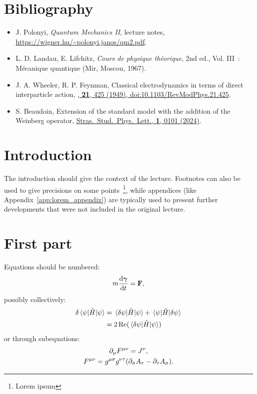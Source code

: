 \documentclass[
 reprint,
 unsortedaddress,
 preprintnumbers,
 nobibnotes,
 nofootinbib,
 longbibliography,
 amsmath,amssymb,
 aps,pra,
 onecolumn
]{revtex4-2}
\def\sspl{Stras.\ Stud.\ Phys.\ Lett.}%
\begin{document}

\section*{Bibliography}

\begin{itemize}
    \item J. Polonyi, \textit{Quantum Mechanics II}, lecture notes, \url{https://wigner.hu/~polonyi.janos/qm2.pdf}.
    \item L. D. Landau, E. Lifchitz, \textit{Cours de physique théorique}, 2nd ed., Vol. III~: Mécanique quantique (Mir, Moscou, 1967).
    \item J. A. Wheeler, R. P. Feynman, Classical electrodynamics in terms of direct interparticle action, \href{https://doi.org/10.1103/RevModPhys.21.425}{\rmp, {\bf 21}, 425 (1949), doi:10.1103/RevModPhys.21.425}.
    \item S. Beaudoin, Extension of the standard model with the addition of the Weinberg operator, \href{https://www.2spl.fr/web/content/607?unique=b4cea604932e47fba8e553dd3b51e55ddadd3f09}{\sspl, {\bf 1}, 0101 (2024)}.
\end{itemize}


\section*{Introduction}

The introduction should give the context of the lecture. Footnotes can also be used to give precisions on some points~\footnote{Lorem ipsum}, while appendices (like Appendix~\ref{app:lorem_appendix}) are typically used to present further developments that were not included in the original lecture.

\section{First part}

Equations should be numbered:
\begin{equation}
    m \dv{\bm\gamma}{t} = \mathbf{F} ,
\end{equation}
possibly collectively:
\begin{equation}
\begin{split}
    \delta \expval{\hat{H}}{\psi} &= \mel{\delta \psi}{\hat{H}}{\psi} + \mel{\psi}{\hat{H}}{\delta \psi} \\
    &= 2 \Re(\mel{\delta \psi}{\hat{H}}{\psi})
\end{split}
\end{equation}
or through subequations:
\begin{subequations}
\begin{gather}
    \partial_\mu F^{\mu\nu} = J^\nu, \\
    F^{\mu\nu} = g^{\mu\sigma} g^{\nu\tau} \pqty{ \partial_\sigma A_\tau - \partial_\tau A_\sigma }.
\end{gather}
\end{subequations}
\end{document}
